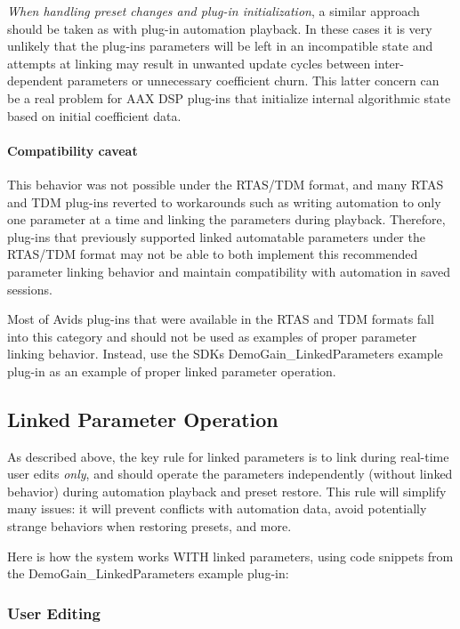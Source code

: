 {\itshape When handling preset changes and plug-\/in initialization}, a similar approach should be taken as with plug-\/in automation playback. In these cases it is very unlikely that the plug-\/in\textquotesingle{}s parameters will be left in an incompatible state and attempts at linking may result in unwanted update cycles between inter-\/dependent parameters or unnecessary coefficient churn. This latter concern can be a real problem for A\+AX D\+SP plug-\/ins that initialize internal algorithmic state based on initial coefficient data.\hypertarget{a00824_linkedParamters_behavior_caveat}{}\paragraph{Compatibility caveat}\label{a00824_linkedParamters_behavior_caveat}
This behavior was not possible under the R\+T\+A\+S/\+T\+DM format, and many R\+T\+AS and T\+DM plug-\/ins reverted to workarounds such as writing automation to only one parameter at a time and linking the parameters during playback. Therefore, plug-\/ins that previously supported linked automatable parameters under the R\+T\+A\+S/\+T\+DM format may not be able to both implement this recommended parameter linking behavior and maintain compatibility with automation in saved sessions.

Most of Avid\textquotesingle{}s plug-\/ins that were available in the R\+T\+AS and T\+DM formats fall into this category and should not be used as examples of proper parameter linking behavior. Instead, use the S\+DK\textquotesingle{}s Demo\+Gain\+\_\+\+Linked\+Parameters example plug-\/in as an example of proper linked parameter operation.\hypertarget{a00824_linkedParameters_linkedParameterOperation}{}\subsection{Linked Parameter Operation}\label{a00824_linkedParameters_linkedParameterOperation}
As described above, the key rule for linked parameters is to link during real-\/time user edits {\itshape only}, and should operate the parameters independently (without linked behavior) during automation playback and preset restore. This rule will simplify many issues\+: it will prevent conflicts with automation data, avoid potentially strange behaviors when restoring presets, and more.

Here is how the system works W\+I\+TH linked parameters, using code snippets from the Demo\+Gain\+\_\+\+Linked\+Parameters example plug-\/in\+:\hypertarget{a00824_linkedParameters_linkedParameterOperation_userEditing}{}\subsubsection{User Editing}\label{a00824_linkedParameters_linkedParameterOperation_userEditing}

